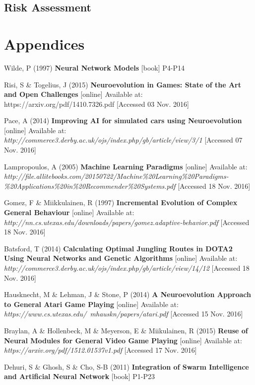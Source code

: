 \documentclass[11pt,a4paper]{article}
\begin{document}
\subsection{Risk Assessment}
\newpage
\section{Appendices}

\begin{thebibliography}{10}

	Wilde, P
	(1997)
	\textbf{Neural Network Models}
	[book]
	P4-P14

	Risi, S \& Togelius, J
	(2015)
	\textbf{Neuroevolution in Games: State of the Art and Open Challenges}
  	[online]
  	Available at: https://arxiv.org/pdf/1410.7326.pdf
  	[Accessed 03 Nov. 2016]

	Pace, A
	(2014)
	\textbf{Improving AI for simulated cars using Neuroevolution}
	[online]
	Available at: \textit{http://commerce3.derby.ac.uk/ojs/index.php/gb/article/view/3/1}
	[Accessed 07 Nov. 2016]
	
	Lampropoulos, A
	(2005)
	\textbf{Machine Learning Paradigms}
	[online]
	Available at: \textit{http://file.allitebooks.com/20150722/Machine\%20Learning\%20Paradigms-\%20Applications\%20in\%20Recommender\%20Systems.pdf}
	[Accessed 18 Nov. 2016]
  
	Gomez, F \& Miikkulainen, R
	(1997)
	\textbf{Incremental Evolution of Complex General Behaviour}
	[online]
	Available at: \textit{http://nn.cs.utexas.edu/downloads/papers/gomez.adaptive-behavior.pdf}
	[Accessed 18 Nov. 2016]
	
	Batsford, T
	(2014)
	\textbf{Calculating Optimal Jungling Routes in DOTA2 Using Neural Networks and Genetic Algorithms}
	[online]
	Available at: \textit{http://commerce3.derby.ac.uk/ojs/index.php/gb/article/view/14/12}
	[Accessed 18 Nov. 2016]
	
	Hausknecht, M \& Lehman, J \& Stone, P
	(2014)
	\textbf{A Neuroevolution Approach to General Atari Game Playing}
	[online]
	Available at: \textit{https://www.cs.utexas.edu/~mhauskn/papers/atari.pdf}
	[Accessed 15 Nov. 2016]
	
	Braylan, A \& Hollenbeck, M \& Meyerson, E \& Miikulainen, R
	(2015)
	\textbf{Reuse of Neural Modules for General Video Game Playing}
	[online]
	Available at: \textit{https://arxiv.org/pdf/1512.01537v1.pdf}
	[Accessed 17 Nov. 2016]
	
	Dehuri, S \& Ghosh, S \& Cho, S-B
	(2011)
	\textbf{Integration of Swarm Intelligence and Artificial Neural Network}
	[book]
	P1-P23

\end{thebibliography}
\end{document}
